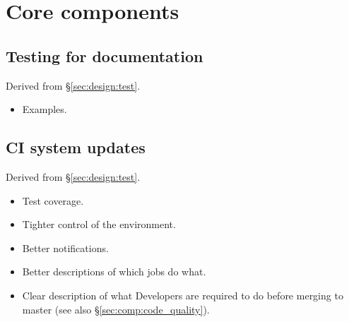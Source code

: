 \section{Core components}
\label{sec:comp}








\subsection{Testing for documentation}
\label{sec:comp:doctest}

Derived from \S\ref{sec:design:test}.


\begin{itemize}

  \item{Examples.}

\end{itemize}

\subsection{CI system updates}
\label{sec:comp:ci}

Derived from \S\ref{sec:design:test}.


\begin{itemize}

  \item{Test coverage.}
  \item{Tighter control of the environment.}
  \item{Better notifications.}
  \item{Better descriptions of which jobs do what.}
  \item{Clear description of what Developers are required to do before merging
  to master (see also \S\ref{sec:comp:code_quality}).}

\end{itemize}






